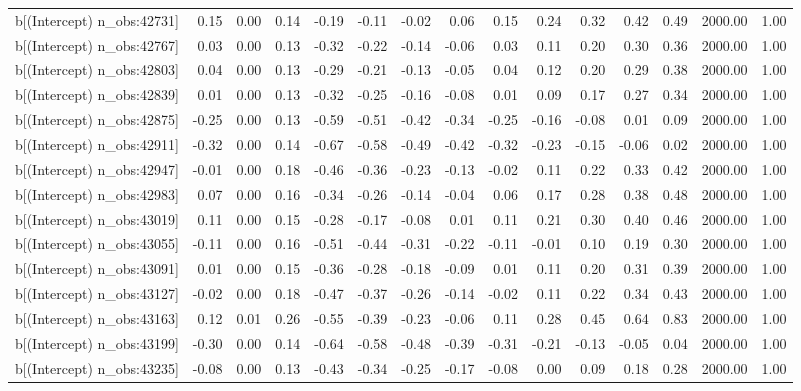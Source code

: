 \begin{table}[ht]
\begin{tabular}{rrrrrrrrrrrrrrr}
  b[(Intercept) n\_obs:42731] & 0.15 & 0.00 & 0.14 & -0.19 & -0.11 & -0.02 & 0.06 & 0.15 & 0.24 & 0.32 & 0.42 & 0.49 & 2000.00 & 1.00 \\ 
  b[(Intercept) n\_obs:42767] & 0.03 & 0.00 & 0.13 & -0.32 & -0.22 & -0.14 & -0.06 & 0.03 & 0.11 & 0.20 & 0.30 & 0.36 & 2000.00 & 1.00 \\ 
  b[(Intercept) n\_obs:42803] & 0.04 & 0.00 & 0.13 & -0.29 & -0.21 & -0.13 & -0.05 & 0.04 & 0.12 & 0.20 & 0.29 & 0.38 & 2000.00 & 1.00 \\ 
  b[(Intercept) n\_obs:42839] & 0.01 & 0.00 & 0.13 & -0.32 & -0.25 & -0.16 & -0.08 & 0.01 & 0.09 & 0.17 & 0.27 & 0.34 & 2000.00 & 1.00 \\ 
  b[(Intercept) n\_obs:42875] & -0.25 & 0.00 & 0.13 & -0.59 & -0.51 & -0.42 & -0.34 & -0.25 & -0.16 & -0.08 & 0.01 & 0.09 & 2000.00 & 1.00 \\ 
  b[(Intercept) n\_obs:42911] & -0.32 & 0.00 & 0.14 & -0.67 & -0.58 & -0.49 & -0.42 & -0.32 & -0.23 & -0.15 & -0.06 & 0.02 & 2000.00 & 1.00 \\ 
  b[(Intercept) n\_obs:42947] & -0.01 & 0.00 & 0.18 & -0.46 & -0.36 & -0.23 & -0.13 & -0.02 & 0.11 & 0.22 & 0.33 & 0.42 & 2000.00 & 1.00 \\ 
  b[(Intercept) n\_obs:42983] & 0.07 & 0.00 & 0.16 & -0.34 & -0.26 & -0.14 & -0.04 & 0.06 & 0.17 & 0.28 & 0.38 & 0.48 & 2000.00 & 1.00 \\ 
  b[(Intercept) n\_obs:43019] & 0.11 & 0.00 & 0.15 & -0.28 & -0.17 & -0.08 & 0.01 & 0.11 & 0.21 & 0.30 & 0.40 & 0.46 & 2000.00 & 1.00 \\ 
  b[(Intercept) n\_obs:43055] & -0.11 & 0.00 & 0.16 & -0.51 & -0.44 & -0.31 & -0.22 & -0.11 & -0.01 & 0.10 & 0.19 & 0.30 & 2000.00 & 1.00 \\ 
  b[(Intercept) n\_obs:43091] & 0.01 & 0.00 & 0.15 & -0.36 & -0.28 & -0.18 & -0.09 & 0.01 & 0.11 & 0.20 & 0.31 & 0.39 & 2000.00 & 1.00 \\ 
  b[(Intercept) n\_obs:43127] & -0.02 & 0.00 & 0.18 & -0.47 & -0.37 & -0.26 & -0.14 & -0.02 & 0.11 & 0.22 & 0.34 & 0.43 & 2000.00 & 1.00 \\ 
  b[(Intercept) n\_obs:43163] & 0.12 & 0.01 & 0.26 & -0.55 & -0.39 & -0.23 & -0.06 & 0.11 & 0.28 & 0.45 & 0.64 & 0.83 & 2000.00 & 1.00 \\ 
  b[(Intercept) n\_obs:43199] & -0.30 & 0.00 & 0.14 & -0.64 & -0.58 & -0.48 & -0.39 & -0.31 & -0.21 & -0.13 & -0.05 & 0.04 & 2000.00 & 1.00 \\ 
  b[(Intercept) n\_obs:43235] & -0.08 & 0.00 & 0.13 & -0.43 & -0.34 & -0.25 & -0.17 & -0.08 & 0.00 & 0.09 & 0.18 & 0.28 & 2000.00 & 1.00 \\ 

\end{tabular}
\end{table}
